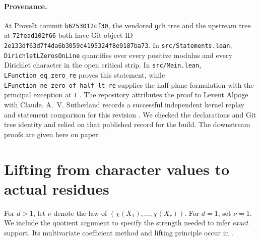 \documentclass[11pt,letterpaper]{article}
\begin{document}
\paragraph{Provenance.}
At ProveIt commit \texttt{b6253012cf30}, the vendored \texttt{grh} tree and the upstream tree at \texttt{72fead102f66} both have Git object ID \texttt{2e133df63d7f4da6b3059c4195324f8e9187ba73}. In \texttt{src/Statements.lean}, \texttt{DirichletLZerosOnLine} quantifies over every positive modulus and every Dirichlet character in the open critical strip. In \texttt{src/Main.lean}, \texttt{LFunction\_eq\_zero\_re} proves this statement, while \texttt{LFunction\_ne\_zero\_of\_half\_lt\_re} supplies the half-plane formulation with the principal exception at \(1\) \cite{lean}. The repository attributes the proof to Levent Alp\"oge with Claude. A.~V. Sutherland records a successful independent kernel replay and statement comparison for this revision \cite{lean}. We checked the declarations and Git tree identity and relied on that published record for the build. The downstream proofs are given here on paper.

\section{Lifting from character values to actual residues}
For \(d>1\), let \(\nu\) denote the law of \((\chi(X_1),\ldots,\chi(X_r))\). For \(d=1\), set \(\nu=1\). We include the quotient argument to specify the strength needed to infer \emph{exact} support. Its multivariate coefficient method and lifting principle occur in \cite{factor}.
\end{document}

